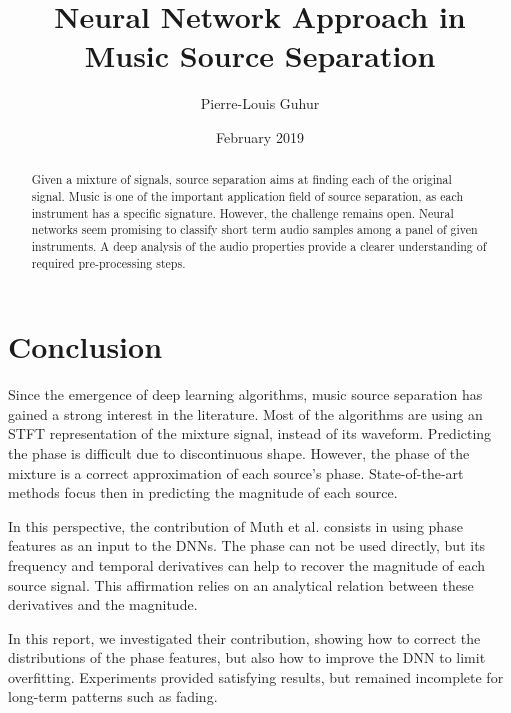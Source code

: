 \documentclass{article}
\title{Neural Network Approach in Music Source Separation}
\author{Pierre-Louis Guhur }
\date{February 2019}
\begin{document}
\maketitle

\begin{abstract}
    Given a mixture of signals, source separation aims at finding each of the original signal.
    Music is one of the important application field of source separation, as each instrument has a specific signature.
    However, the challenge remains open. Neural networks seem promising to classify short term audio samples among a panel of given instruments.
    A deep analysis of the audio properties provide a clearer understanding of required pre-processing steps.
\end{abstract}







\section{Conclusion}

Since the emergence of deep learning algorithms, music source separation has gained
a strong interest in the literature.
Most of the algorithms are using an STFT representation of the mixture signal,
instead of its waveform.
Predicting the phase is difficult due to discontinuous shape.
However, the phase of the mixture is a correct approximation of each source's phase.
State-of-the-art methods focus then in predicting the magnitude of each source.

In this perspective, the contribution of Muth et al. consists in using phase features
as an input to the DNNs. The phase can not be used directly, but its frequency
and temporal derivatives can help to recover the magnitude of each source signal.
This affirmation relies on an analytical relation between these derivatives and
the magnitude.

In this report, we investigated their contribution, showing how to correct the
distributions of the phase features, but also how to improve the DNN to limit
overfitting. Experiments provided satisfying results, but remained incomplete
for long-term patterns such as fading.


{\small


}
\end{document}
